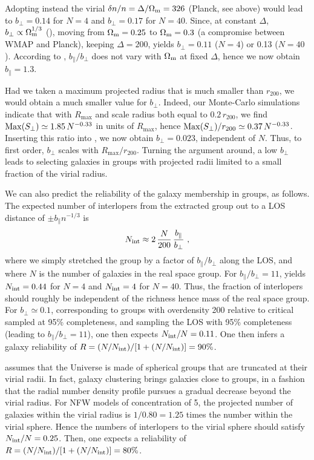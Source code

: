 Adopting instead the virial $\delta n/n = \Delta/\Omega_{\rm m} = 326$ (Planck,
see above) would lead to $b_\perp = 0.14$ for $N=4$ and $b_\perp=0.17$ for
$N=40$. Since, at constant $\Delta$, $b_\perp \propto \Omega_{\rm m}^{1/3}$
(), moving from $\Omega_{\rm m}=0.25$ to
$\Omega_{\rm m}=0.3$ (a compromise between WMAP and Planck), keeping
$\Delta=200$,  yields $b_\perp=0.11$ ($N=4$) or 0.13 ($N=40$). According to
, $b_\parallel/b_\perp$ does not vary with
$\Omega_{\rm m}$ at fixed $\Delta$, hence we now obtain $b_\parallel = 1.3$.

Had we taken a maximum projected  radius that is much smaller than $r_{200}$,
we would obtain a much smaller value for $b_\perp$. Indeed, our Monte-Carlo
simulations indicate that with $R_{\max}$ and scale radius both equal to
$0.2\,r_{200}$, we find ${\rm Max}(S_\perp) \simeq 1.85\,N^{-0.33}$ in units of
$R_{\max}$, hence ${\rm Max}(S_\perp)/r_{200} \simeq 0.37\,N^{-0.33}$.
Inserting this ratio into , we now obtain $b_\perp
= 0.023$, independent of $N$. Thus, to first order, $b_\perp$ scales with
$R_{\max}/r_{200}$. Turning the argument around, a low $b_\perp$ leads to
selecting galaxies in groups with projected radii limited to a small fraction
of the virial radius.

We can also predict the reliability of the galaxy membership in groups, as
follows. The expected number of interlopers from the extracted group out to a
LOS distance of $\pm b_\parallel n^{-1/3}$ is
%
\begin{equation}
    N_{\rm int} \approx 2\,{N\over 200} \,{b_\parallel\over b_\perp} \ ,
    \label{eq:Nilop}
\end{equation}
%
where we simply stretched the group by a factor of $b_\parallel/b_\perp$ along
the LOS, and where $N$ is the number of galaxies in the real space group. For
$b_\parallel/b_\perp=11$,  yields $N_{\rm int}= 0.44$
for $N=4$ and $N_{\rm int}=4$ for $N=40$. Thus, the fraction of interlopers
should roughly be independent of the richness hence mass of the real space
group. For $b_\perp \simeq 0.1$, corresponding to groups with overdensity 200
relative to critical sampled at 95\% completeness, and sampling the LOS with
95\% completeness (leading to $b_\parallel/b_\perp=11$), one then expects
$N_{\rm int}/N = 0.11$. One then infers a galaxy reliability of $R=(N/N_{\rm
int})/[1+(N/N_{\rm int})] = 90\%$.

 assumes that the Universe is made of spherical groups
that are truncated at their virial radii. In fact, galaxy clustering brings
galaxies close to groups, in a fashion that the radial number density profile
pursues a gradual decrease beyond the virial radius. For NFW models of
concentration of 5, the projected number of galaxies within the virial radius
is $1/0.80 = 1.25$ times the number within the virial sphere. Hence the numbers
of interlopers to the virial sphere should satisfy $N_{\rm int}/N=0.25$. Then,
one expects a reliability of $R=(N/N_{\rm int})/[1+(N/N_{\rm int})] = 80\%$.

